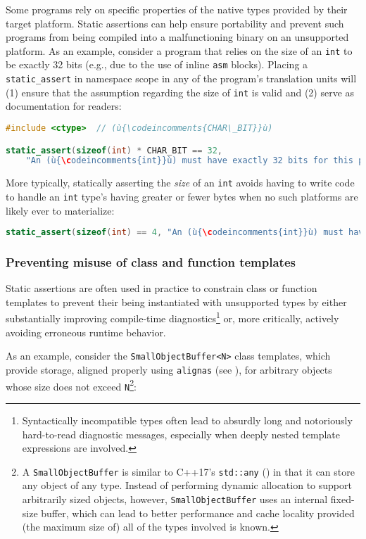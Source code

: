 Some programs rely on specific properties of the native types provided
by their target platform. Static assertions can help ensure portability
and prevent such programs from being compiled into a malfunctioning
binary on an unsupported platform. As an example, consider a
program that relies on the size of an \lstinline!int! to be exactly 32
bits (e.g., due to the use of inline \lstinline!asm! blocks). Placing a
\lstinline!static_assert! in namespace scope in any of the program's
translation units will (1) ensure that the assumption regarding the size
of \lstinline!int! is valid and (2) serve as documentation for readers:

\begin{lstlisting}[language=C++]
#include <ctype>  // (ù{\codeincomments{CHAR\_BIT}}ù)

static_assert(sizeof(int) * CHAR_BIT == 32,
    "An (ù{\codeincomments{int}}ù) must have exactly 32 bits for this program to work correctly.");
\end{lstlisting}

\noindent More typically, statically asserting the \emph{size} of an \lstinline!int!
avoids having to write code to handle an \lstinline!int! type's having
greater or fewer bytes when no such platforms are likely ever to
materialize:

\begin{lstlisting}[language=C++]
static_assert(sizeof(int) == 4, "An (ù{\codeincomments{int}}ù) must have exactly 4 bytes.");
\end{lstlisting}


\subsubsection[Preventing misuse of class and function templates]{Preventing misuse of class and function templates}\label{preventing-misuse-of-class-and-function-templates}

Static assertions are often used in practice to constrain class or
function templates to prevent their being instantiated with unsupported
types by either substantially improving compile-time
diagnostics{\cprotect\footnote{Syntactically incompatible types often
lead to absurdly long and notoriously hard-to-read diagnostic messages, especially when deeply nested template expressions are involved.}} or, more critically, actively avoiding
erroneous runtime behavior.

As an example, consider the \lstinline!SmallObjectBuffer<N>! class
templates, which provide storage, aligned properly using \lstinline!alignas! (see
),
for arbitrary objects whose size does
not exceed \lstinline!N!{\cprotect\footnote{A \lstinline!SmallObjectBuffer! is
  similar to C++17's \lstinline!std::any! (\cite{cpprefstdany}) in
  that it can store any object of any type. Instead of performing
  dynamic allocation to support arbitrarily sized objects, however,
  \lstinline!SmallObjectBuffer! uses an internal fixed-size buffer, which
  can lead to better performance and cache locality provided (the
  maximum size of) all of the types involved is known.}}:

